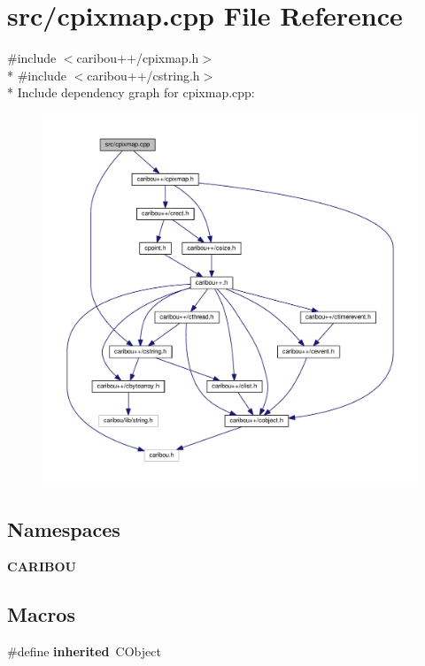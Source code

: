 \section{src/cpixmap.cpp File Reference}
\label{cpixmap_8cpp}
{\ttfamily \#include $<$caribou++/cpixmap.\-h$>$}\\*
{\ttfamily \#include $<$caribou++/cstring.\-h$>$}\\*
Include dependency graph for cpixmap.\-cpp\-:\nopagebreak
\begin{figure}[H]
\begin{center}
\leavevmode
\includegraphics[width=350pt]{cpixmap_8cpp__incl}
\end{center}
\end{figure}
\subsection*{Namespaces}
\begin{DoxyCompactItemize}
\item 
{\bf C\-A\-R\-I\-B\-O\-U}
\end{DoxyCompactItemize}
\subsection*{Macros}
\begin{DoxyCompactItemize}
\item 
\#define {\bf inherited}~C\-Object
\end{DoxyCompactItemize}


